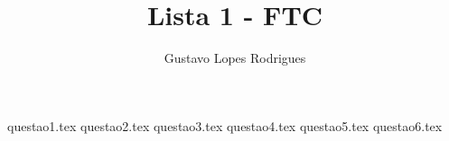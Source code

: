 \documentclass[10pt,a4paper]{article}
\author{Gustavo Lopes Rodrigues}
\title{Lista 1 - FTC}
\begin{document}
	\maketitle
	
	{questao1.tex}
	{questao2.tex}
	{questao3.tex}
	{questao4.tex}
	{questao5.tex}
	{questao6.tex}
\end{document}
